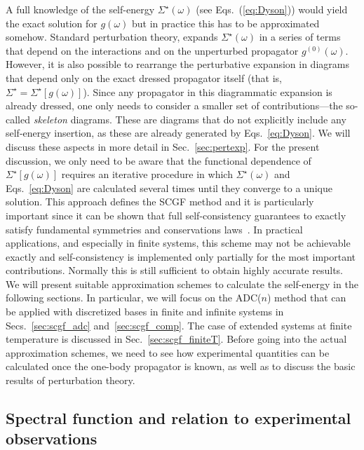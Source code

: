  
 A full knowledge of the self-energy  $\Sigma^{\star}(\omega)$ (see Eqs.~(\ref{eq:Dyson})) would yield the exact solution for $g(\omega)$ but in practice this has to be approximated somehow.
 Standard perturbation theory,  expands $\Sigma^{\star}(\omega)$ in a series of terms that depend on the interactions and on the unperturbed propagator $g^{(0)}(\omega)$.  However, it is also possible to rearrange the 
perturbative expansion in diagrams that depend only on the exact dressed propagator itself (that is, $\Sigma^{\star}=\Sigma^{\star}[g(\omega)]$).  Since any propagator in this diagrammatic expansion is already dressed, one only needs to consider a smaller set of contributions---the so-called  {\em skeleton} diagrams.
These are diagrams that  do not explicitly include any self-energy insertion, as these are already generated by Eqs.~\eqref{eq:Dyson}. 
We will discuss these aspects in more detail in Sec.~\ref{sec:pertexp}.
%
For the present discussion, we only need to be aware that the functional dependence of $\Sigma^{\star}[g(\omega)]$  requires an iterative procedure in which  $\Sigma^{\star}(\omega)$ and Eqs.~\eqref{eq:Dyson} are calculated several times until they converge to a unique solution.
This approach defines the SCGF method and it is particularly important since it can be shown that full self-consistency guarantees to exactly satisfy fundamental symmetries and conservations laws~\cite{ch11_Baym1961,ch11_Baym1962}.
In practical applications, and especially in finite systems, this scheme may not be achievable exactly and self-consistency is implemented only partially for the most important contributions. Normally this is still sufficient to obtain highly accurate results.
 We will present suitable approximation schemes to calculate the self-energy in the following sections. In particular, we will focus on the ADC($n$) method   that can be applied with discretized bases in finite and infinite systems in Secs.~\ref{sec:scgf_adc} and~\ref{sec:scgf_comp}. The case of extended systems at finite temperature is discussed in Sec.~\ref{sec:scgf_finiteT}.   Before going into the actual approximation schemes, we need to see how experimental quantities can be calculated  once the one-body propagator is known, as well as to discuss the basic results of  perturbation theory.




\subsection{Spectral function and relation to experimental observations}
\label{sec:scgf_obs}

